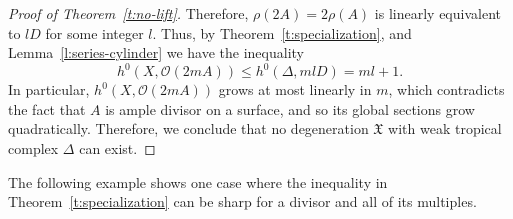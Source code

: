 \documentclass[11pt]{amsart}
\theoremstyle{definition}
\newcommand{\X}{\mathfrak X}
\begin{document}
\begin{proof}[Proof of Theorem~\ref{t:no-lift}]
Therefore, $\rho(2A) = 2 \rho(A)$ is linearly equivalent to $lD$ for some
integer $l$. Thus, by Theorem~\ref{t:specialization}, and
Lemma~\ref{l:series-cylinder} we have the inequality
\begin{equation*}
h^0(X, \mathcal O(2mA)) \leq h^0(\Delta, mlD) = ml + 1.
\end{equation*}
In particular, $h^0(X, \mathcal O(2mA))$ grows at most linearly in $m$, which
contradicts the fact that $A$ is ample divisor on a surface, and so its global
sections grow quadratically. Therefore, we conclude that no degeneration
$\X$ with weak tropical complex $\Delta$ can exist.
\end{proof}

The following example shows one case where the inequality in
Theorem~\ref{t:specialization} can be sharp for a divisor and all of its
multiples.
\end{document}

